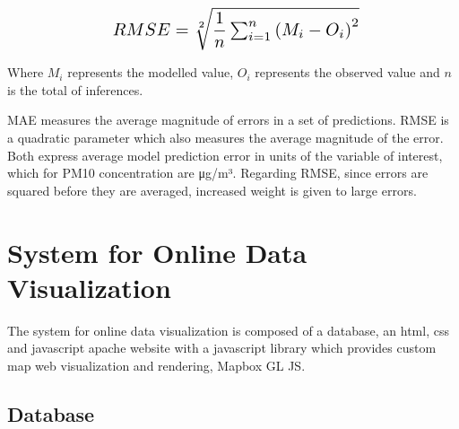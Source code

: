 \begin{equation} 
\label{rmse}
\scalebox{1.4}{ $ RMSE = \sqrt[2]{\dfrac{1}{n}\sum_{i=1}^{n} {(M_i - O_i)}^{2}}$}
\end{equation}


Where $M_i$ represents the modelled value, $O_i$ represents the observed value and $n$ is the total of inferences.%

\ac{MAE} measures the average magnitude of errors in a set of predictions. \ac{RMSE} is a quadratic parameter which also measures the average magnitude of the error.
Both express average model prediction error in units of the variable of interest, which for PM10 concentration are μg/m³. Regarding RMSE, since errors are squared before they are averaged, increased weight is given to large errors.






\section{System for Online Data Visualization} 

The system for online data visualization is composed of a database, an html, css and javascript apache website with a javascript library which provides custom map web visualization and rendering, Mapbox GL JS.

\subsection{Database}

